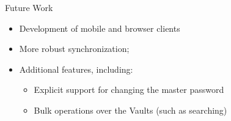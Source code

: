 \documentclass[newPxFont,noprogressbar,table]{beamer}
\begin{document}
\begin{frame}{Future Work}

\vspace*{-5em}
\begin{itemize}
\item Development of mobile and browser clients
\item More robust synchronization;
\item Additional features, including:

\begin{itemize}
\item Explicit support for changing the master password
\item Bulk operations over the \textcolor{sthlmBlue}{Vaults} (such as searching)
\end{itemize}

\end{itemize}

\end{frame}

\fi
\end{document}
